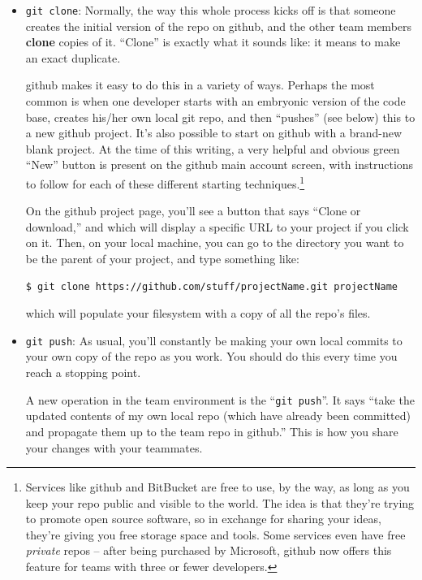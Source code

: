 \begin{itemize}
\item \texttt{git clone}: Normally, the way this whole process kicks off is
that someone creates the initial version of the repo on github, and the other
team members \textbf{clone} copies of it. ``Clone'' is exactly what it sounds
like: it means to make an exact duplicate.

github makes it easy to do this in a variety of ways. Perhaps the most common
is when one developer starts with an embryonic version of the code base,
creates his/her own local git repo, and then ``pushes'' (see below) this to a
new github project. It's also possible to start on github with a brand-new
blank project. At the time of this writing, a very helpful and obvious green
``New'' button is present on the github main account screen, with instructions
to follow for each of these different starting techniques.\footnote{Services
like github and BitBucket are free to use, by the way, as long as you keep your
repo public and visible to the world. The idea is that they're trying to
promote open source software, so in exchange for sharing your ideas, they're
giving you free storage space and tools. Some services even have free
\textit{private} repos -- after being purchased by Microsoft, github now offers
this feature for teams with three or fewer developers.}

On the github project page, you'll see a button that says ``Clone or
download,'' and which will display a specific URL to your project if you click
on it. Then, on your local machine, you can go to the directory you want to be
the parent of your project, and type something like:

\begin{Verbatim}[fontsize=\small,samepage=true,frame=none]
$ git clone https://github.com/stuff/projectName.git projectName
\end{Verbatim}

which will populate your filesystem with a copy of all the repo's files.

\pagebreak
{}
\item \texttt{git push}: As usual, you'll constantly be making your own local
commits to your own copy of the repo as you work. You should do this every
time you reach a stopping point.

A new operation in the team environment is the ``\texttt{git push}''. It says
``take the updated contents of my own local repo (which have already been
committed) and propagate them up to the team repo in github.'' This is how you
share your changes with your teammates.


\end{itemize}
